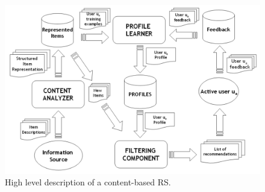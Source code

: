 \begin{figure}[h]
    \center
    \includegraphics[scale=0.3]{inc/implementation/HighlevelContentBased}
    \caption{High level description of a content-based RS.\citep[p.~76]{lops:2011}}
    \label{fig:framework-contentbasedrs}
\end{figure}

